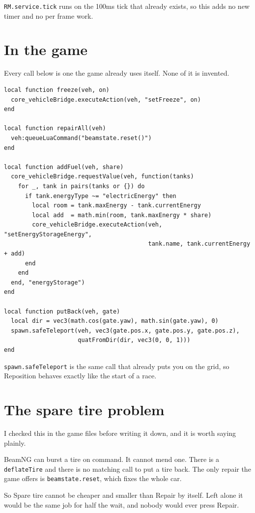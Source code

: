\documentclass[11pt,a4paper]{article}
\newcommand{\code}[1]{\texttt{\small #1}}
\begin{document}
\code{RM.service.tick} runs on the 100ms tick that already exists, so this
adds no new timer and no per frame work.

\section{In the game}

Every call below is one the game already uses itself. None of it is invented.

\begin{lstlisting}
local function freeze(veh, on)
  core_vehicleBridge.executeAction(veh, "setFreeze", on)
end

local function repairAll(veh)
  veh:queueLuaCommand("beamstate.reset()")
end

local function addFuel(veh, share)
  core_vehicleBridge.requestValue(veh, function(tanks)
    for _, tank in pairs(tanks or {}) do
      if tank.energyType ~= "electricEnergy" then
        local room = tank.maxEnergy - tank.currentEnergy
        local add  = math.min(room, tank.maxEnergy * share)
        core_vehicleBridge.executeAction(veh, "setEnergyStorageEnergy",
                                         tank.name, tank.currentEnergy + add)
      end
    end
  end, "energyStorage")
end

local function putBack(veh, gate)
  local dir = vec3(math.cos(gate.yaw), math.sin(gate.yaw), 0)
  spawn.safeTeleport(veh, vec3(gate.pos.x, gate.pos.y, gate.pos.z),
                     quatFromDir(dir, vec3(0, 0, 1)))
end
\end{lstlisting}

\code{spawn.safeTeleport} is the same call that already puts you on the grid,
so Reposition behaves exactly like the start of a race.

\section{The spare tire problem}

I checked this in the game files before writing it down, and it is worth
saying plainly.

BeamNG can burst a tire on command. It cannot mend one. There is a
\code{deflateTire} and there is no matching call to put a tire back. The only
repair the game offers is \code{beamstate.reset}, which fixes the whole car.

So Spare tire cannot be cheaper and smaller than Repair by itself. Left alone
it would be the same job for half the wait, and nobody would ever press
Repair.
\end{document}
